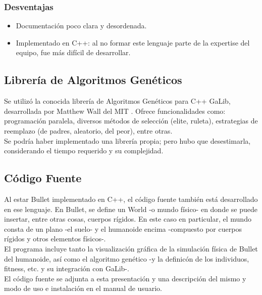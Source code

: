 \documentclass{article}
\begin{document}
\subsubsection{Desventajas}
\begin{itemize}[leftmargin=5.5mm]
\item Documentaci\'on poco clara y desordenada.
\item Implementado en C++: al no formar este lenguaje parte de la expertise del equipo, fue m\'as dif\'icil de desarrollar.
\end{itemize}




\subsection{Librer\'ia de Algoritmos Gen\'eticos}

Se utiliz\'o la conocida librer\'ia de Algoritmos Gen\'eticos para C++ GaLib, desarrollada por Matthew Wall del MIT \cite{LinkGaLib}.  Ofrece funcionalidades como: programaci\'on paralela, diversos m\'etodos de selecci\'on (elite, ruleta), estrategias de reemplazo (de padres, aleatorio, del peor), entre otras.\\
Se podr\'ia haber implementado una librer\'ia propia; pero hubo que desestimarla, considerando el tiempo requerido y su complejidad.


\subsection{C\'odigo Fuente}

Al estar Bullet implementado en C++, el c\'odigo fuente tambi\'en est\'a desarrollado en ese lenguaje. En Bullet, se define un World -o mundo f\'isico- en donde se puede insertar, entre otras cosas, cuerpos r\'igidos. En este caso en particular, el mundo consta de un plano  -el suelo- y  el humanoide encima -compuesto por cuerpos r\'igidos y otros elementos f\'isicos-. \\
El programa incluye tanto la visualizaci\'on gr\'afica de la simulaci\'on f\'isica de Bullet del humanoide, as\'i como el algoritmo gen\'etico -y la definic\'on de los individuos, fitness, etc. y su integraci\'on con GaLib-.
\\El c\'odigo fuente se adjunta a esta presentaci\'on y una descripci\'on del mismo y modo de uso e instalaci\'on en el manual de usuario.
\end{document}

